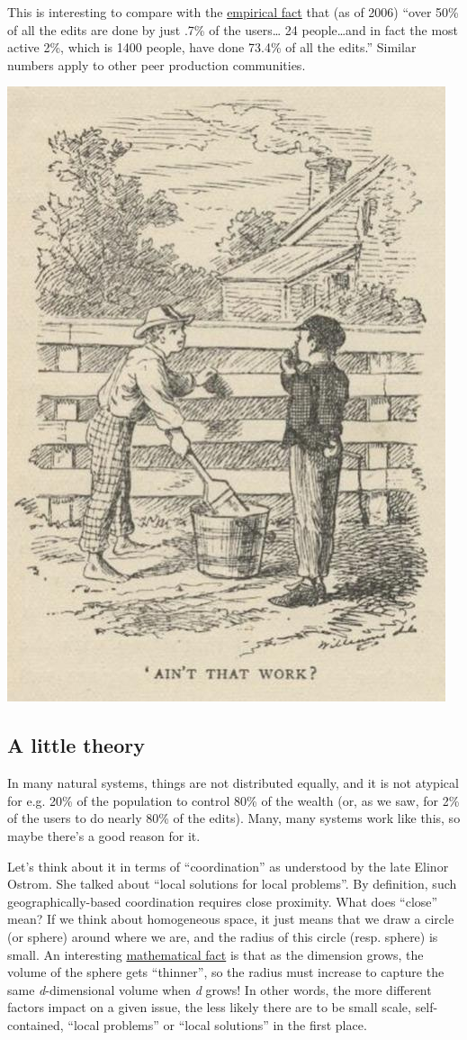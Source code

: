 This is interesting to compare with the
\href{http://www.aaronsw.com/weblog/whowriteswikipedia}{empirical fact}
that (as of 2006) ``over 50\% of all the edits are done by just .7\% of
the users\ldots{} 24 people\ldots{}and in fact the most active 2\%,
which is 1400 people, have done 73.4\% of all the edits.'' Similar
numbers apply to other peer production communities.

\begin{center}
\includegraphics[width=.5\textwidth]{../pictures/tom-sawyer.jpeg}
\end{center}

\subsection{A little theory}

In many natural systems, things are not distributed equally, and it is
not atypical for e.g. 20\% of the population to control 80\% of the
wealth (or, as we saw, for 2\% of the users to do nearly 80\% of the
edits). Many, many systems work like this, so maybe there's a good
reason for it.

Let's think about it in terms of ``coordination'' as understood by the
late Elinor Ostrom. She talked about ``local solutions for local
problems''. By definition, such geographically-based coordination
requires close proximity. What does ``close'' mean? If we think about
homogeneous space, it just means that we draw a circle (or sphere)
around where we are, and the radius of this circle (resp. sphere) is
small. An interesting
\href{http://en.wikipedia.org/wiki/N-sphere\#Volume\_and\_surface\_area}{mathematical
fact} is that as the dimension grows, the volume of the sphere gets
``thinner'', so the radius must increase to capture the same
\emph{d}-dimensional volume when \emph{d} grows! In other words, the
more different factors impact on a given issue, the less likely there
are to be small scale, self-contained, ``local problems'' or ``local
solutions'' in the first place.

